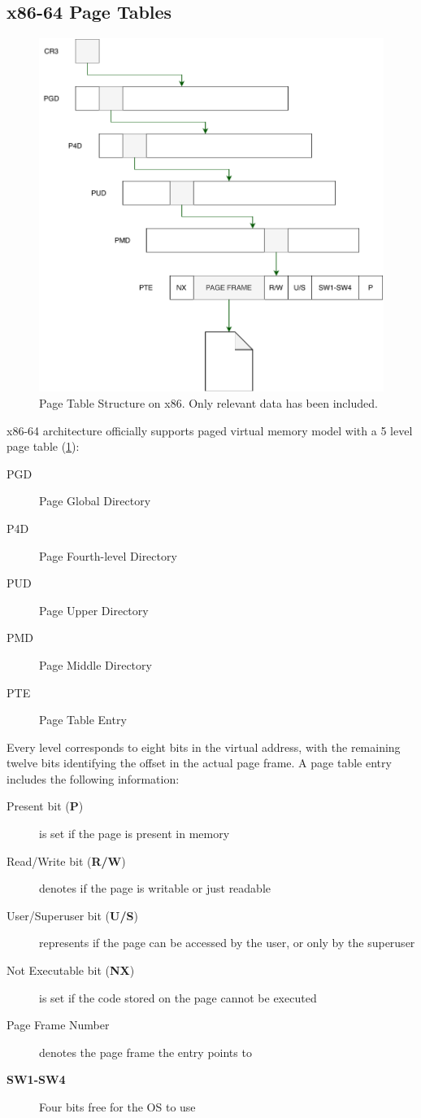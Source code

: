 \subsection{x86-64 Page Tables}
\label{subsec:x86pgtables}
\begin{figure}[]
  \centering
  \includegraphics[width = .35 \textwidth]{img/pagetable.pdf}
  \caption{Page Table Structure on x86. Only relevant data has been included.}
  \label{fig:pagetable}
\end{figure}
x86-64 architecture officially supports paged virtual memory model with a 5 
level page table (\cref{fig:pagetable}):
\begin{description}
    \item[PGD] Page Global Directory
    \item[P4D] Page Fourth-level Directory
    \item[PUD] Page Upper Directory
    \item[PMD] Page Middle Directory
    \item[PTE] Page Table Entry
\end{description}

Every level corresponds to eight bits in the virtual address, with the remaining twelve
bits identifying the offset in the actual page frame. A page table entry
includes the following information:
\begin{description}
    \item[Present bit (\textbf{P})] is set if the page is present in memory
    \item[Read/Write bit (\textbf{R/W})] denotes if the page is writable or just
         readable
    \item[User/Superuser bit (\textbf{U/S})] represents if the page can be 
    accessed by the user, or only by the superuser
    \item[Not Executable bit (\textbf{NX})] is set if the code stored on the 
    page cannot be executed
    \item[Page Frame Number] denotes the page frame the entry points to
    \item[\textbf{SW1-SW4}] Four bits free for the OS to use
\end{description}

